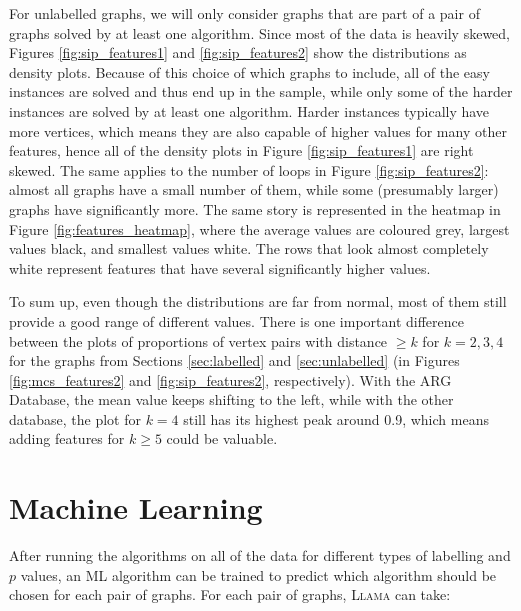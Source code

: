 \documentclass{l4proj}
\theoremstyle{definition}
\theoremstyle{remark}
\begin{document}
For unlabelled graphs, we will only consider graphs that are part of a pair of
graphs solved by at least one algorithm. Since most of the data is heavily
skewed, Figures \ref{fig:sip_features1} and \ref{fig:sip_features2} show the
distributions as density plots. Because of this choice of which graphs to
include, all of the easy instances are solved and thus end up in the sample,
while only some of the harder instances are solved by at least one algorithm.
Harder instances typically have more vertices, which means they are also capable
of higher values for many other features, hence all of the density plots in
Figure \ref{fig:sip_features1} are right skewed. The same applies to the number
of loops in Figure \ref{fig:sip_features2}: almost all graphs have a small
number of them, while some (presumably larger) graphs have significantly more.
The same story is represented in the heatmap in Figure
\ref{fig:features_heatmap}, where the average values are coloured grey, largest
values black, and smallest values white. The rows that look almost completely
white represent features that have several significantly higher values.

To sum up, even though the distributions are far from normal, most of them still
provide a good range of different values. There is one important difference
between the plots of proportions of vertex pairs with distance $\ge k$ for $k =
2, 3, 4$ for the graphs from Sections \ref{sec:labelled} and \ref{sec:unlabelled} (in Figures
\ref{fig:mcs_features2} and \ref{fig:sip_features2}, respectively). With
the ARG Database, the mean value keeps shifting to the left, while with the
other database, the plot for $k = 4$ still has its highest peak around 0.9,
which means adding features for $k \ge 5$ could be valuable.

\chapter{Machine Learning}
After running the algorithms on all of the data for different types of labelling
and $p$ values, an ML algorithm can be trained to predict which algorithm should
be chosen for each pair of graphs. For each pair of graphs, \textsc{Llama} can
take:
\end{document}
